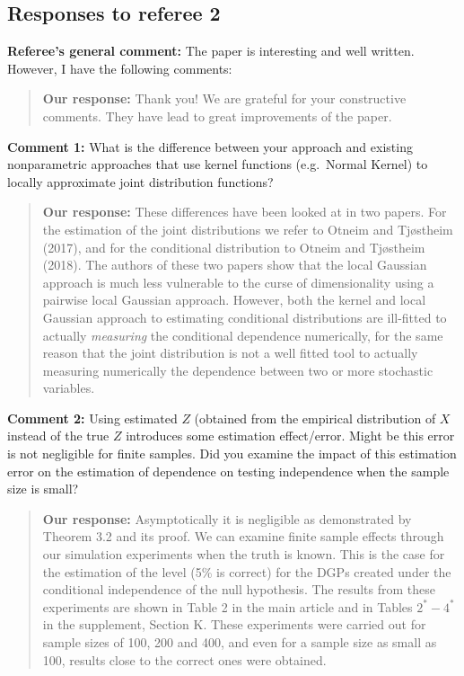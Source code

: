 \documentclass[
  12pt,
  letterpaper]{article}
\numberwithin{equation}{section}
\begin{document}
\hypertarget{responses-to-referee-2}{%
\subsection{Responses to referee 2}\label{responses-to-referee-2}}

\textbf{Referee's general comment:} The paper is interesting and well written. However, I have the following comments:

\begin{quote}
\textbf{Our response:} Thank you! We are grateful for your constructive comments. They have lead to great improvements of the paper.
\end{quote}

\textbf{Comment 1:} What is the difference between your approach and existing nonparametric approaches that use kernel functions (e.g.~Normal Kernel) to locally approximate joint distribution functions?

\begin{quote}
\textbf{Our response:} These differences have been looked at in two papers. For the estimation of the joint distributions we refer to Otneim and Tjøstheim (2017), and for the conditional distribution to Otneim and Tjøstheim (2018). The authors of these two papers show that the local Gaussian approach is much less vulnerable to the curse of dimensionality using a pairwise local Gaussian approach. However, both the kernel and local Gaussian approach to estimating conditional distributions are ill-fitted to actually \emph{measuring} the conditional dependence numerically, for the same reason that the joint distribution is not a well fitted tool to actually measuring numerically the dependence between two or more stochastic variables.
\end{quote}

\textbf{Comment 2:} Using estimated \(Z\) (obtained from the empirical distribution of \(X\) instead of the true \(Z\) introduces some estimation effect/error. Might be this error is not negligible for finite samples. Did you examine the impact of this estimation error on the estimation of dependence on testing independence when the sample size is small?

\begin{quote}
\textbf{Our response:} Asymptotically it is negligible as demonstrated by Theorem 3.2 and its proof. We can examine finite sample effects through our simulation experiments when the truth is known. This is the case for the estimation of the level (5\% is correct) for the DGPs created under the conditional independence of the null hypothesis. The results from these experiments are shown in Table 2 in the main article and in Tables \(2^* - 4^*\) in the supplement, Section K. These experiments were carried out for sample sizes of 100, 200 and 400, and even for a sample size as small as 100, results close to the correct ones were obtained.
\end{quote}
\end{document}
